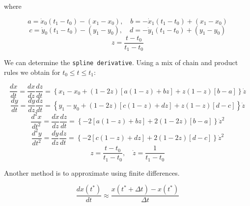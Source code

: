 where

\[a = \dot{x}_0(t_1-t_0)-(x_1-x_0), \quad b = -\dot{x}_1(t_1-t_0)+(x_1-x_0)\]\[c = \dot{y}_0(t_1-t_0)-(y_1-y_0), \quad d = -\dot{y}_1(t_1-t_0)+(y_1-y_0)\]\[z = \displaystyle \frac{t - t_0}{t_1-t_0}\]

We can determine the \texttt{spline\ derivative}. Using a mix of chain
and product rules we obtain for \(t_0 \leq t \leq t_1\):

\[\displaystyle \frac{dx}{dt} =  \frac{dx}{dz}  \frac{dz}{dt} = \left\{x_1 -x_0  + (1 - 2z)\left[ a(1-z) +b z\right] + z(1-z)\left[ b-a\right]\right\}\dot{z}\]\[\displaystyle \frac{dy}{dt} =  \frac{dy}{dz}  \frac{dz}{dt} = \left\{y_1 -y_0  + (1 - 2z)\left[ c(1-z) +d z\right] + z(1-z)\left[ d-c\right]\right\}\dot{z}\]\[\displaystyle \frac{d^2x}{dt^2} =  \frac{d\dot{x}}{dz}  \frac{dz}{dt} = \left\{-2\left[ a(1-z) +b z\right] + 2(1-2z)\left[ b-a\right]\right\}\dot{z}^2\]\[\displaystyle \frac{d^2y}{dt^2} =  \frac{d\dot{y}}{dz}  \frac{dz}{dt} = \left\{-2\left[ c(1-z) +d z\right] + 2(1-2z)\left[ d-c\right]\right\}\dot{z}^2\]\[z = \displaystyle \frac{t - t_0}{t_1-t_0}, \quad  \dot{z} = \frac{1}{t_1-t_0}\]

Another method is to approximate using finite differences.

\[\frac{dx(t^*)}{dt} \approx  \frac{x(t^* + \Delta t) - x(t^*)}{\Delta t}\]
